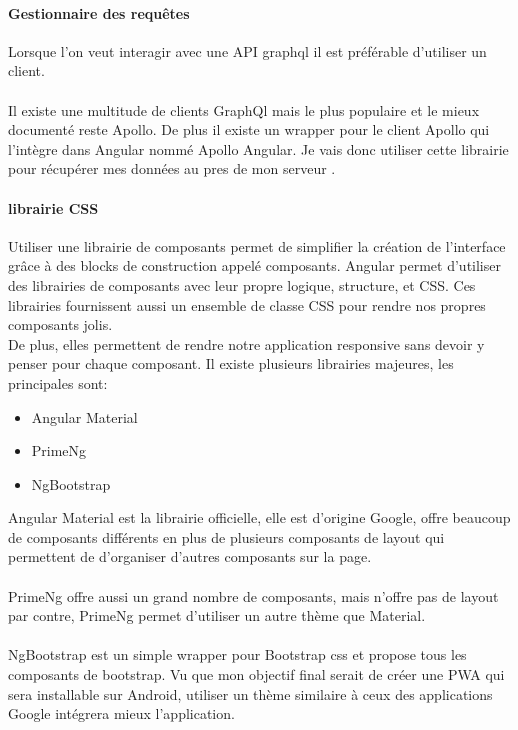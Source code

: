 \paragraph{Gestionnaire des requêtes}
Lorsque l'on veut interagir avec une API graphql il est préférable d'utiliser un client.\\\\

Il existe une multitude de clients GraphQl mais le plus populaire et le mieux documenté reste Apollo.
De plus il existe un wrapper pour le client Apollo qui l'intègre dans Angular nommé Apollo Angular.
Je vais donc utiliser cette librairie pour récupérer mes données au pres de mon serveur .

\paragraph{librairie CSS}
Utiliser une librairie de composants permet de simplifier la création de l'interface grâce à des blocks de construction appelé composants\@.
Angular permet d'utiliser des librairies de composants avec leur propre logique, structure, et CSS\@.
Ces librairies fournissent aussi un ensemble de classe CSS pour rendre nos propres composants jolis.\\
De plus, elles permettent de rendre notre application responsive sans devoir y penser pour chaque composant.
Il existe plusieurs librairies majeures, les principales sont:
\begin{itemize}
    \item Angular Material
    \item PrimeNg
    \item NgBootstrap
\end{itemize}
Angular Material est la librairie officielle, elle est d'origine Google,
offre beaucoup de composants différents en plus de plusieurs composants de layout qui permettent de d'organiser d'autres composants sur la page.\\\\

PrimeNg offre aussi un grand nombre de composants, mais n'offre pas de layout par contre,
PrimeNg permet d'utiliser un autre thème que Material.\\\\
NgBootstrap est un simple wrapper pour Bootstrap css et propose tous les composants de bootstrap.
Vu que mon objectif final serait de créer une PWA qui sera installable sur Android,
utiliser un thème similaire à ceux des applications Google intégrera mieux l'application.
\newpage

